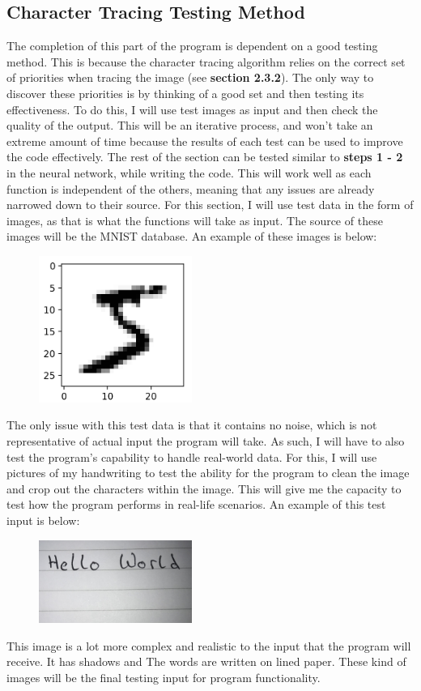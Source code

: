 \documentclass{report}
\begin{document}
\subsection{Character Tracing Testing Method}
The completion of this part of the program is dependent on a good testing method. This is because the character tracing algorithm relies on the correct set of priorities when tracing the image (see \textbf{section 2.3.2}). The only way to discover these priorities is by thinking of a good set and then testing its effectiveness. To do this, I will use test images as input and then check the quality of the output. This will be an iterative process, and won't take an extreme amount of time because the results of each test can be used to improve the code effectively.
\newline
The rest of the section can be tested similar to \textbf{steps 1 - 2} in the neural network, while writing the code. This will work well as each function is independent of the others, meaning that any issues are already narrowed down to their source.
\newline
For this section, I will use test data in the form of images, as that is what the functions will take as input. The source of these images will be the MNIST database. An example of these images is below:
\begin{figure}[H]
    \centering
    \includegraphics[width=5cm]{Images/Development and Testing/Method/Example MNIST Image.png} 
    \label{fig:MNIST input}
\end{figure}
\noindent The only issue with this test data is that it contains no noise, which is not representative of actual input the program will take. As such, I will have to also test the program's capability to handle real-world data. For this, I will use pictures of my handwriting to test the ability for the program to clean the image and crop out the characters within the image. This will give me the capacity to test how the program performs in real-life scenarios. An example of this test input is below:
\begin{figure}[H]
    \centering
    \includegraphics[width=5cm]{Images/Development and Testing/Method/Real-World Example.jpg} 
    \label{fig:Real World input}
\end{figure}
\noindent This image is a lot more complex and realistic to the input that the program will receive. It has shadows and The words are written on lined paper. These kind of images will be the final testing input for program functionality.
\newpage
\end{document}
